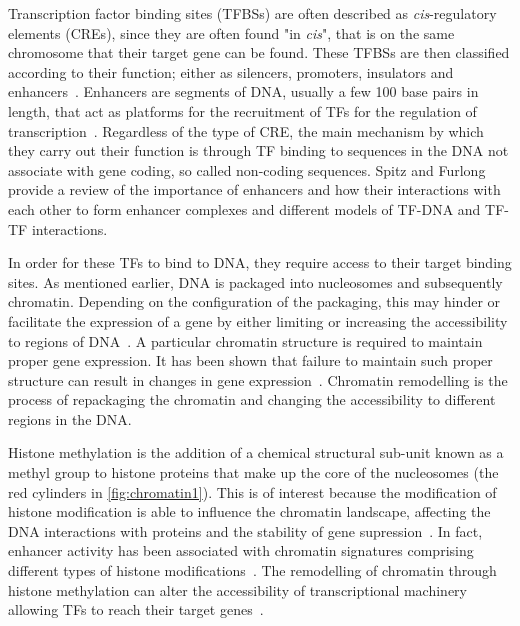         Transcription factor binding sites (TFBSs) are often described as \emph{cis}-regulatory elements (CREs), since they are often found "in \emph{cis}", that is on the same chromosome that their target gene can be found. These TFBSs are then classified according to their function; either as silencers, promoters, insulators and enhancers~\cite{gaszner2006insulators, gross1988nuclease, li1999locus}. Enhancers are segments of DNA, usually a few 100 base pairs in length, that act as platforms for the recruitment of TFs for the regulation of transcription~\cite{spitz2012transcription}. Regardless of the type of CRE, the main mechanism by which they carry out their function is through TF binding to sequences in the DNA not associate with gene coding, so called non-coding sequences. Spitz and Furlong~\cite{spitz2012transcription} provide a review of the importance of enhancers and how their interactions with each other to form enhancer complexes and different models of TF-DNA and TF-TF interactions. 
        
        In order for these TFs to bind to DNA, they require access to their target binding sites. As mentioned earlier, DNA is packaged into nucleosomes and subsequently chromatin. Depending on the configuration of the packaging, this may hinder or facilitate the expression of a gene by either limiting or increasing the accessibility to regions of DNA~\cite{li2007role}. A particular chromatin structure is required to maintain proper gene expression. It has been shown that failure to maintain such proper structure can result in changes in gene expression~\cite{ehrlich2001dna}. Chromatin remodelling is the process of repackaging the chromatin and changing the accessibility to different regions in the DNA. %

        Histone methylation is the addition of a chemical structural sub-unit known as a methyl group to histone proteins that make up the core of the nucleosomes (the red cylinders in \ref{fig:chromatin1}). This is of interest because the modification of histone modification is able to influence the chromatin landscape, affecting the DNA interactions with proteins and the stability of gene supression~\cite{jaenisch2003epigenetic, whetstine2009histone}.
        In fact, enhancer activity has been associated with chromatin signatures comprising different types of histone modifications~\cite{heintzman2007distinct, creyghton2010histone, rada2011unique}.
        The remodelling of chromatin through histone methylation can alter the accessibility of transcriptional machinery allowing TFs to reach their target genes~\cite{gibney2010epigenetics, holoch2015rna}. 
        
